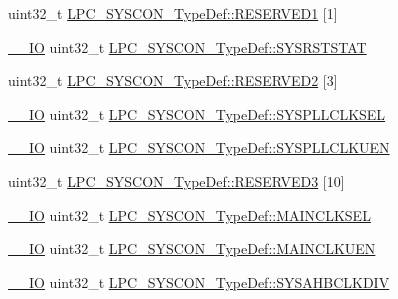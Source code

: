 \begin{DoxyCompactItemize}
\item 
uint32\+\_\+t \hyperlink{group___l_p_c11xx___definitions_gab6f6035ebae5d3f6b21c40f152417cd2}{L\+P\+C\+\_\+\+S\+Y\+S\+C\+O\+N\+\_\+\+Type\+Def\+::\+R\+E\+S\+E\+R\+V\+E\+D1} \mbox{[}1\mbox{]}
\item 
\hyperlink{group___c_m_s_i_s__core__definitions_gaec43007d9998a0a0e01faede4133d6be}{\+\_\+\+\_\+\+IO} uint32\+\_\+t \hyperlink{group___l_p_c11xx___definitions_ga7fff308582edb9f7bfd034d3dcfde524}{L\+P\+C\+\_\+\+S\+Y\+S\+C\+O\+N\+\_\+\+Type\+Def\+::\+S\+Y\+S\+R\+S\+T\+S\+T\+AT}
\item 
uint32\+\_\+t \hyperlink{group___l_p_c11xx___definitions_gaadb6b4a71da6b8f321e2e4080864b1c1}{L\+P\+C\+\_\+\+S\+Y\+S\+C\+O\+N\+\_\+\+Type\+Def\+::\+R\+E\+S\+E\+R\+V\+E\+D2} \mbox{[}3\mbox{]}
\item 
\hyperlink{group___c_m_s_i_s__core__definitions_gaec43007d9998a0a0e01faede4133d6be}{\+\_\+\+\_\+\+IO} uint32\+\_\+t \hyperlink{group___l_p_c11xx___definitions_ga51f62077336072e5861eaf1fccebfa25}{L\+P\+C\+\_\+\+S\+Y\+S\+C\+O\+N\+\_\+\+Type\+Def\+::\+S\+Y\+S\+P\+L\+L\+C\+L\+K\+S\+EL}
\item 
\hyperlink{group___c_m_s_i_s__core__definitions_gaec43007d9998a0a0e01faede4133d6be}{\+\_\+\+\_\+\+IO} uint32\+\_\+t \hyperlink{group___l_p_c11xx___definitions_gae66518ea53c8ee53935f6a073262dab7}{L\+P\+C\+\_\+\+S\+Y\+S\+C\+O\+N\+\_\+\+Type\+Def\+::\+S\+Y\+S\+P\+L\+L\+C\+L\+K\+U\+EN}
\item 
uint32\+\_\+t \hyperlink{group___l_p_c11xx___definitions_gab166232abfe71225f9b41a1400d6ffaa}{L\+P\+C\+\_\+\+S\+Y\+S\+C\+O\+N\+\_\+\+Type\+Def\+::\+R\+E\+S\+E\+R\+V\+E\+D3} \mbox{[}10\mbox{]}
\item 
\hyperlink{group___c_m_s_i_s__core__definitions_gaec43007d9998a0a0e01faede4133d6be}{\+\_\+\+\_\+\+IO} uint32\+\_\+t \hyperlink{group___l_p_c11xx___definitions_gac54af00088fc697ce0954b04ec4786c8}{L\+P\+C\+\_\+\+S\+Y\+S\+C\+O\+N\+\_\+\+Type\+Def\+::\+M\+A\+I\+N\+C\+L\+K\+S\+EL}
\item 
\hyperlink{group___c_m_s_i_s__core__definitions_gaec43007d9998a0a0e01faede4133d6be}{\+\_\+\+\_\+\+IO} uint32\+\_\+t \hyperlink{group___l_p_c11xx___definitions_ga37489ea97331f7e125153289ab06b236}{L\+P\+C\+\_\+\+S\+Y\+S\+C\+O\+N\+\_\+\+Type\+Def\+::\+M\+A\+I\+N\+C\+L\+K\+U\+EN}
\item 
\hyperlink{group___c_m_s_i_s__core__definitions_gaec43007d9998a0a0e01faede4133d6be}{\+\_\+\+\_\+\+IO} uint32\+\_\+t \hyperlink{group___l_p_c11xx___definitions_ga2ddbe116af6e92606b3cce1ca897a4d0}{L\+P\+C\+\_\+\+S\+Y\+S\+C\+O\+N\+\_\+\+Type\+Def\+::\+S\+Y\+S\+A\+H\+B\+C\+L\+K\+D\+IV}

\end{DoxyCompactItemize}

